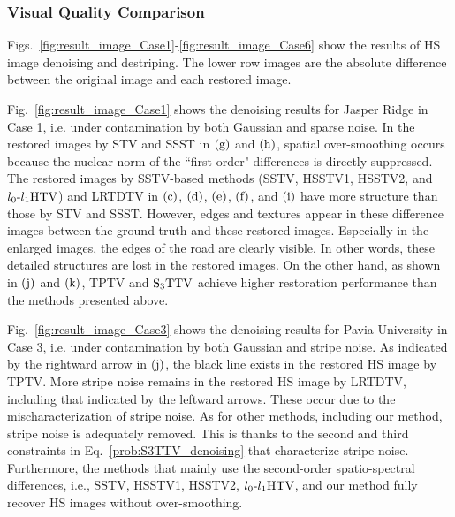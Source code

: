 \documentclass[10pt,journal]{IEEEtran}
\begin{document}
\subsubsection{Visual Quality Comparison}
Figs.~\ref{fig:result_image_Case1}-\ref{fig:result_image_Case6} show the results of HS image denoising and destriping.
The lower row images are the absolute difference between the original image and each restored image.

Fig.~\ref{fig:result_image_Case1} shows the denoising results for Jasper Ridge in Case 1, i.e. under contamination by both Gaussian and sparse noise.
In the restored images by STV and SSST in $\text{(g)}$ and $\text{(h)}$, spatial over-smoothing occurs because the nuclear norm of the “first-order" differences is directly suppressed.
The restored images by SSTV-based methods (SSTV, HSSTV1, HSSTV2, and ${l_{0}\text{-}l_{1}\text{HTV}}$) and LRTDTV in $\text{(c)}$, $\text{(d)}$, $\text{(e)}$, $\text{(f)}$, and $\text{(i)}$ have more structure than those by STV and SSST.
However, edges and textures appear in these difference images between the ground-truth and these restored images.
Especially in the enlarged images, the edges of the road are clearly visible.
In other words, these detailed structures are lost in the restored images.
On the other hand, as shown in $\text{(j)}$ and $\text{(k)}$, TPTV and ${\text{S}_{3} \text{TTV}}$ achieve higher restoration performance than the methods presented above. 

Fig.~\ref{fig:result_image_Case3} shows the denoising results for Pavia University in Case 3, i.e. under contamination by both Gaussian and stripe noise.
As indicated by the rightward arrow in $\text{(j)}$, the black line exists in the restored HS image by TPTV.
More stripe noise remains in the restored HS image by LRTDTV, including that indicated by the leftward arrows.
These occur due to the mischaracterization of stripe noise.
As for other methods, including our method, stripe noise is adequately removed.
This is thanks to the second and third constraints in Eq.~\eqref{prob:S3TTV_denoising} that characterize stripe noise.
Furthermore, the methods that mainly use the second-order spatio-spectral differences, i.e., SSTV, HSSTV1, HSSTV2, ${l_{0}\text{-}l_{1}\text{HTV}}$, and our method fully recover HS images without over-smoothing.
\end{document}
